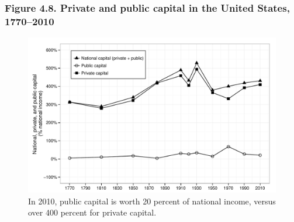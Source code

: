 \documentclass[t]{beamer}\usepackage[]{graphicx}\usepackage[]{color}
\newenvironment{knitrout}{}{} %
\begin{document}
\begin{frame}[label=Figure_4_8]
\frametitle{Figure 4.8. Private and public capital in the United States, 1770--2010}
\begin{figure}[t]
\begin{minipage}[b]{\textwidth}
\centering
\begin{knitrout}\footnotesize
{}\color{fgcolor}

{\centering \includegraphics[width=1\linewidth]{figures/bw/Figure_4_8} 

}



\end{knitrout}
\caption{In 2010, public capital is worth 20 percent of national income, versus over 400 percent for private capital.}
\end{minipage}
\end{figure}
\end{frame}
\end{document}
